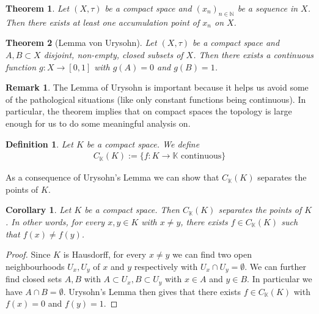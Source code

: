 \documentclass[11pt,a4paper]{article}
\newtheorem{thm}{Theorem}[section]
\newtheorem{cor}{Corollary}[section]
\newtheorem{defn}{Definition}[section]
\theoremstyle{definition}
\newtheorem{rem}{Remark}[section]
\begin{document}
\begin{thm} Let $(X, \tau)$ be a compact space and $(x_n)_{n \in \mathbb{N}}$ be a sequence in $X$. Then there exists at least one accumulation point of $x_n$ on $X$. 
\end{thm}
\begin{thm}[Lemma von Urysohn] Let $(X, \tau)$ be a compact space and $A,B \subset X$ disjoint, non-empty, closed subsets of $X$. Then there exists a continuous function $g: X \to [0,1]$ with $g(A)=0$ and $g(B)=1$. 
\end{thm}
\begin{rem} The Lemma of Urysohn is important because it helps us avoid some of the pathological situations (like only constant functions being continuous). In particular, the theorem implies that on compact spaces the topology is large enough for us to do some meaningful analysis on. 
\end{rem}
\newpage
\begin{defn} Let $K$ be a compact space. We define
\begin{align*}
C_\mathbb{K}(K):= \lbrace f: K \to \mathbb{K} \text{ continuous}\rbrace
\end{align*}
\end{defn}
\noindent As a consequence of Urysohn's Lemma we can show that $C_\mathbb{K}(K)$ separates the points of $K$. 
\begin{cor} Let $K$ be a compact space. Then $C_\mathbb{K}(K)$ separates the points of $K$. In other words, for every $x,y \in K$ with $x \neq y$, there exists $f \in C_\mathbb{K}(K)$ such that $f(x) \neq f(y)$.
\end{cor}
\begin{proof}
Since $K$ is Hausdorff, for every $x \neq y$ we can find two open neighbourhoods $U_x, U_y$ of $x$ and $y$ respectively with $U_x \cap U_y = \emptyset$. We can further find closed sets $A,B$ with $A \subset U_x, B \subset U_y$ with $x \in A$ and $y \in B$. In particular we have $A \cap B = \emptyset$. Urysohn's Lemma then gives that there exists $f \in C_\mathbb{K}(K)$ with $f(x)=0$ and $f(y)=1$. 
\end{proof}
\end{document}
